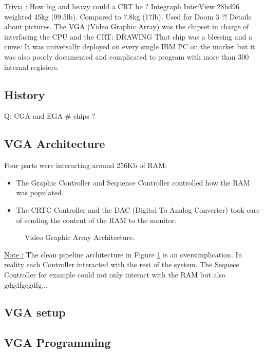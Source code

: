\documentclass[book.tex]{subfiles}
\begin{document}
{\underline{Trivia :}} How big and heavy could a CRT be ? Integraph InterView 28hd96 weighted 45kg (99.5lb). Compared to 7.8kg (17lb). Used for Doom 3 ?! Details about pictures.
\bigskip
The VGA (Video Graphic Array) was the chipset in charge of interfacing the CPU and the CRT:
\bigskip
DRAWING
\bigskip
That chip was a blessing and a curse: It was universally deployed on every single IBM PC on the market but it was also poorly documented and complicated to program with more than 300 internal registers.



  \subsection{History}

  Q: CGA and EGA \# chips ?


  \subsection{VGA Architecture}

  Four parts were interacting around 256Kb of RAM:

\begin{itemize}
\item The Graphic Controller and Sequence Controller controlled how the RAM was populated.
\item The CRTC Controller and the DAC (Digital To Analog Converter) took care of sending the content of the RAM to the monitor.
\end{itemize}

 \begin{figure}[H]
\centering
 
 \caption{Video Graphic Array Architecture.}\label{fig:vga_arch}
 \end{figure}

 {\underline{Note :}} The clean pipeline architecture in Figure \ref{fig:vga_arch} is an oversimplication. In reality each Controller interacted with the rest of the system. The Sequece Controller for example could not only interact with the RAM but also gdgdfgegdfg...

  \subsection{VGA setup}

  \subsection{VGA Programming}
\end{document}
